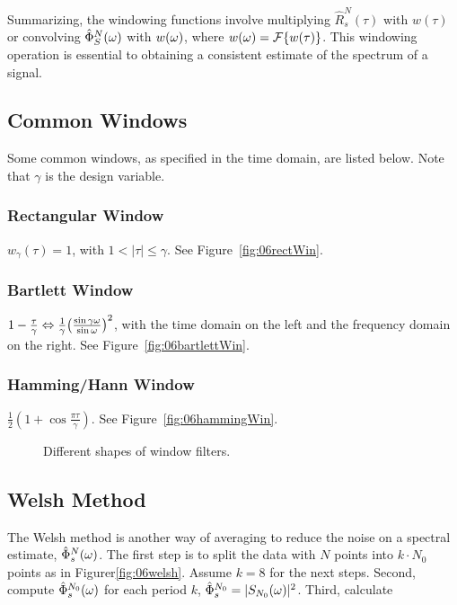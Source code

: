 Summarizing, the windowing functions involve multiplying $\hat{R}_s^N(\tau)$ with $w(\tau)$ or convolving $\hat{\Phi}_S^N(\omega)$ with $w(\omega)$, where $w(\omega)=\mathcal{F}\{w(\tau)\}$.
This windowing operation is essential to obtaining a consistent estimate of the spectrum of a signal.

\subsection{Common Windows}
Some common windows, as specified in the time domain, are listed below.
Note that $\gamma$ is the design variable.

\subsubsection{Rectangular Window}
$w_\gamma(\tau) = 1$, with $1<|\tau|\leq\gamma$.
See Figure~\ref{fig:06rectWin}.

\subsubsection{Bartlett Window}
$1-\frac{\tau}{\gamma} \Leftrightarrow \frac{1}{\gamma}{\left(\frac{\sin\gamma\omega}{\sin\omega}\right)}^2$, with the time domain on the left and the frequency domain on the right.
See Figure~\ref{fig:06bartlettWin}.

\subsubsection{Hamming/Hann Window}
$\frac{1}{2}\left(1+\cos\frac{\pi\tau}{\gamma}\right)$.
See Figure~\ref{fig:06hammingWin}.

\begin{figure}[ht!]
\centering
{}\hfill
{}\hfill
{}
\caption{Different shapes of window filters.}%
\label{fig:06filterShapes}
\end{figure}

\subsection{Welsh Method}
The Welsh method is another way of averaging to reduce the noise on a spectral estimate, $\hat{\Phi}_s^N(\omega)$.
The first step is to split the data with $N$ points into $k\cdot N_0$ points as in Figurer\ref{fig:06welsh}.
Assume $k=8$ for the next steps.
Second, compute $\hat{\Phi}_s^{N_0}(\omega)$ for each period $k$, $\hat{\Phi}_s^{N_0} = |S_{N_0}(\omega)|^2$.
Third, calculate

